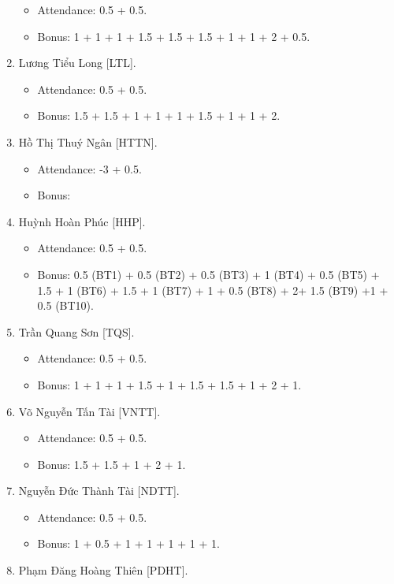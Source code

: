 \documentclass{article}
\begin{document}
\begin{enumerate}
\begin{itemize}
        \item Attendance: 0.5 + 0.5.
        \item Bonus: 1 + 1 + 1 + 1.5 + 1.5 + 1.5 + 1 + 1 + 2 + 0.5.
    \end{itemize}
    \item {\sc Lương Tiểu Long [LTL].}
    \begin{itemize}
        \item Attendance: 0.5 + 0.5.
        \item Bonus: 1.5 + 1.5 + 1 + 1 + 1 + 1.5 + 1 + 1 + 2.
    \end{itemize}
    \item {\sc Hồ Thị Thuý Ngân [HTTN].}
    \begin{itemize}
        \item Attendance: -3 + 0.5.
        \item Bonus:
    \end{itemize}
    \item {\sc Huỳnh Hoàn Phúc [HHP].}
    \begin{itemize}
        \item Attendance: 0.5 + 0.5.
        \item Bonus: 0.5 (BT1) + 0.5 (BT2) + 0.5 (BT3) + 1 (BT4) + 0.5 (BT5) + 1.5 + 1 (BT6) + 1.5 + 1 (BT7) + 1 + 0.5 (BT8) + 2+ 1.5 (BT9) +1 +  0.5 (BT10).
    \end{itemize}
    \item {\sc Trần Quang Sơn [TQS].}
    \begin{itemize}
        \item Attendance: 0.5 + 0.5.
        \item Bonus: 1 + 1 + 1 + 1.5 + 1 + 1.5 + 1.5 + 1 + 2 + 1.
    \end{itemize}
    \item {\sc Võ Nguyễn Tấn Tài [VNTT].}
    \begin{itemize}
        \item Attendance: 0.5 + 0.5.
        \item Bonus: 1.5 + 1.5 + 1 + 2 + 1.
    \end{itemize}
    \item {\sc Nguyễn Đức Thành Tài [NDTT].}
    \begin{itemize}
        \item Attendance: 0.5 + 0.5.
        \item Bonus: 1 + 0.5 + 1 + 1 + 1 + 1 + 1.
    \end{itemize}
    \item {\sc Phạm Đăng Hoàng Thiên [PDHT].}

\end{enumerate}
\end{document}
